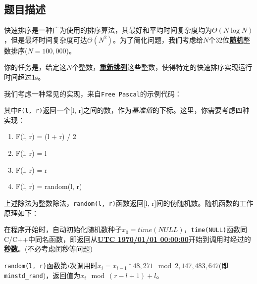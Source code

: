 \documentclass[hyperref,UTF8,12pt,a4paper]{ctexart}
\begin{document}
\subsection{题目描述}

快速排序是一种广为使用的排序算法，其最好和平均时间复杂度均为$\Theta(N\log N)$，但是最坏时间复杂度可达$\Theta(N^2)$。为了简化问题，我们考虑给$N$个32位\underline{\textbf{随机}}整数排序($N=100,000$)。

你的任务是，给定这$N$个整数，\underline{\textbf{重新排列}}这些整数，使得特定的快速排序实现运行时间超过1s。

我们考虑一种常见的实现，来自\verb|Free Pascal|的示例代码：

\begin{algorithm}
\begin{algorithmic}[1]
\Repeat
{}
\EndWhile
{}
\EndWhile
{}
\EndIf
{}
\EndIf
{}
\EndIf
\EndProcedure
\end{algorithmic}
\end{algorithm}

其中\verb|F(l, r)|返回一个[l, r]之间的数，作为\emph{基准值}的下标。这里，你需要考虑四种实现：

\begin{enumerate}
\item F(l, r) = (l + r) / 2
\item F(l, r) = l
\item F(l, r) = r
\item F(l, r) = random(l, r)
\end{enumerate}

上述除法为整数除法，\verb|random(l, r)|函数返回[l, r]间的伪随机数。随机函数的工作原理如下：

在程序开始时，自动初始化随机数种子$x_0 = time(NULL)$，\verb|time(NULL)|函数同C/C++中同名函数，即返回从\underline{\textbf{UTC 1970/01/01 00:00:00}}开始到调用时经过的\underline{\textbf{秒数}}。(不必考虑闰秒等问题)

\verb|random(l, r)|函数第$i$次调用时$x_i = x_{i-1} * 48,271 \mod 2,147,483,647$(即\\\verb|minstd_rand|)，返回值为$x_i \mod (r-l+1) +l$。
\end{document}
